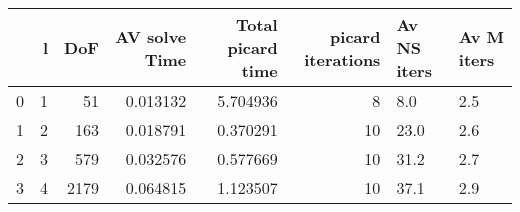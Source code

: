 \begin{tabular}{lrrrrrll}
\toprule
{} &  l &   DoF &  AV solve Time &  Total picard time &  picard iterations & Av NS iters & Av M iters \\
\midrule
0 &  1 &    51 &       0.013132 &           5.704936 &                  8 &         8.0 &        2.5 \\
1 &  2 &   163 &       0.018791 &           0.370291 &                 10 &        23.0 &        2.6 \\
2 &  3 &   579 &       0.032576 &           0.577669 &                 10 &        31.2 &        2.7 \\
3 &  4 &  2179 &       0.064815 &           1.123507 &                 10 &        37.1 &        2.9 \\
\bottomrule
\end{tabular}
